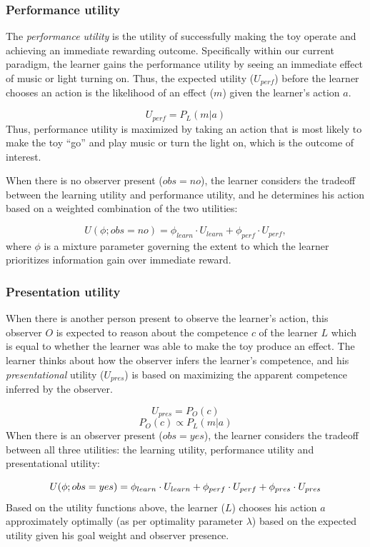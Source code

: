 \documentclass[10pt, letterpaper]{article}
\begin{document}
\subsubsection{Performance utility}\label{performance-utility}

The \emph{performance utility} is the utility of successfully making the
toy operate and achieving an immediate rewarding outcome. Specifically
within our current paradigm, the learner gains the performance utility
by seeing an immediate effect of music or light turning on. Thus, the
expected utility (\(U_{perf}\)) before the learner chooses an action is
the likelihood of an effect (\(m\)) given the learner's action \(a\).

\[ U_{perf} = P_L(m | a) \] \noindent
Thus, performance utility is maximized by taking an action that is most
likely to make the toy ``go'' and play music or turn the light on, which
is the outcome of interest.

When there is no observer present (\(obs = no\)), the learner considers
the tradeoff between the learning utility and performance utility, and
he determines his action based on a weighted combination of the two
utilities:

\[ U(\phi; obs = no) = \phi_{learn} \cdot U_{learn} + \phi_{perf} \cdot U_{perf} ,\]
\noindent
where \(\phi\) is a mixture parameter governing the extent to which the
learner prioritizes information gain over immediate reward.

\subsubsection{Presentation utility}\label{presentation-utility}

When there is another person present to observe the learner's action,
this observer \(O\) is expected to reason about the competence \(c\) of
the learner \(L\) which is equal to whether the learner was able to make
the toy produce an effect. The learner thinks about how the observer
infers the learner's competence, and his \emph{presentational} utility
(\(U_{pres}\)) is based on maximizing the apparent competence inferred
by the observer.

\[ U_{pres} = P_O(c)\] \[ P_O(c) \propto P_L(m | a)\] When there is an
observer present (\(obs = yes\)), the learner considers the tradeoff
between all three utilities: the learning utility, performance utility
and presentational utility:

\[ U(\phi; obs = yes) = \phi_{learn} \cdot U_{learn} + \\ \phi_{perf} \cdot U_{perf} + \phi_{pres} \cdot U_{pres}\]
Based on the utility functions above, the learner (\(L\)) chooses his
action \(a\) approximately optimally (as per optimality parameter
\(\lambda\)) based on the expected utility given his goal weight and
observer presence.
\end{document}
